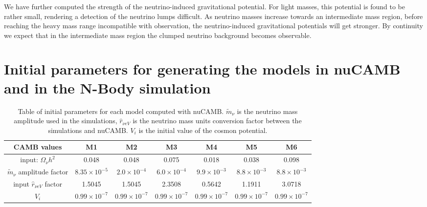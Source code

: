 We have further computed the strength of the neutrino-induced gravitational
potential. For light masses, this potential is found to be rather
small, rendering a detection of the neutrino lumps difficult. As neutrino
masses increase towards an intermediate mass region, before reaching
the heavy mass range incompatible with observation, the neutrino-induced
gravitational potentials will get stronger. By continuity we expect
that in the intermediate mass region the clumped neutrino background
becomes observable. 





\section{\label{sec:Initial-parameters-for-nucamb}Initial parameters for
generating the models in nuCAMB and in the N-Body simulation}

\begin{table}[H]
\tiny
\centering{}%
\begin{tabular}{|c|c|c|c|c|c|c|}
\hline 
CAMB values  & M1  & M2  & M3  & M4  & M5  & M6\tabularnewline
\hline 
\hline 
input: $\Omega_{\nu}h^{2}$  & 0.048  & 0.048  & 0.075  & 0.018  & 0.038  & 0.098\tabularnewline
\hline 
$\tilde{m}_{\nu}$ amplitude factor  & $8.35\times10^{-5}$  & $2.0\times10^{-4}$  & $6.0\times10^{-4}$  & $9.9\times10^{-3}$  & $8.8\times10^{-3}$  & $8.8\times10^{-3}$\tabularnewline
\hline 
input $\hat{r}_{\nu eV}$ factor  & 1.5045  & 1.5045  & 2.3508  & 0.5642  & 1.1911  & 3.0718\tabularnewline
\hline 
$V_{i}$  & $0.99\times10^{-7}$  & $0.99\times10^{-7}$  & $0.99\times10^{-7}$  & $0.99\times10^{-7}$  & $0.99\times10^{-7}$  & $0.99\times10^{-7}$\tabularnewline
\hline 
\end{tabular}
\small
\protect\protect\protect\caption[Table of initial values for nuCAMB used in GNQ simulations.]{\label{tab:CAMB-inipars-1} Table of initial parameters for each model
computed with nuCAMB. $\tilde{m}_{\nu}$ is the neutrino mass amplitude
used in the simulations, $\hat{r}_{\nu eV}$ is the neutrino mass
units conversion factor between the simulations and nuCAMB. $V_{i}$
is the initial value of the cosmon potential. }
\end{table}
\normalsize

